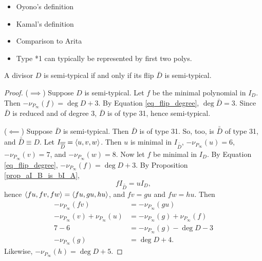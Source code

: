 \begin{itemize}
  \item Oyono's definition
  \item Kamal's definition
  \item Comparison to Arita
  \item Type *1 can typically be represented by first two polys.
\end{itemize}

\begin{theorem}
  A divisor $D$ is semi-typical if and only if its flip $\bar D$ is semi-typical.
\end{theorem}
\begin{proof}
  ($\implies$)
  Suppose $D$ is semi-typical.
  Let $f$ be the minimal polynomial in $I_D$.
  Then $-\nu_{P_\infty}(f) = \deg D + 3$.
  By Equation \ref{eq_flip_degree}, $\deg \bar D = 3$.
  Since $\bar D$ is reduced and of degree 3, $\bar D$ is of type 31, hence semi-typical.
  
  ($\impliedby$)
  Suppose $\bar D$ is semi-typical.
  Then $\bar D$ is of type 31.
  So, too, is $\bar{\bar D}$ of type 31, and $\bar{\bar D} \equiv D$.
  Let $I_{\overline {\overline D}} = \left\langle u,v,w \right\rangle$.
  Then $u$ is minimal in $I_{\bar{\bar D}}$,
  $-\nu_{P_\infty}(u) = 6$, $-\nu_{P_\infty}(v) = 7$, and $-\nu_{P_\infty}(w) = 8$.
  Now let $f$ be minimal in $I_D$.
  By Equation \ref{eq_flip_degree}, $-\nu_{P_\infty}(f) = \deg D + 3$.
  By Proposition \ref{prop_aI_B_is_bI_A},
  \[ fI_{\bar{\bar D}} = uI_D, \]
  hence $\left\langle fu, fv, fw \right\rangle = \left\langle fu, gu, hu \right\rangle$, and $fv = gu$ and $fw = hu$.
  Then
  \begin{align*}
    -\nu_{P_\infty}(fv) &= -\nu_{P_\infty}(gu) \\
    -\nu_{P_\infty}(v) + \nu_{P_\infty}(u) &= -\nu_{P_\infty}(g) + \nu_{P_\infty}(f) \\
    7 - 6 &= -\nu_{P_\infty}(g) - \deg D - 3\\
    -\nu_{P_\infty}(g) &=  \deg D + 4.
  \end{align*}
  Likewise, $-\nu_{P_\infty}(h) =  \deg D + 5$.
\end{proof}

